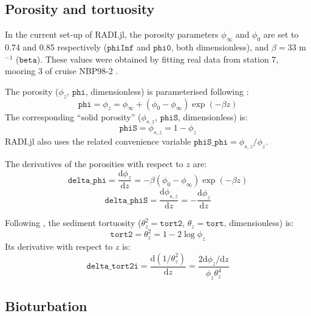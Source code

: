 \documentclass[a4paper]{article}
\newcommand{\D}[1]{\mathrm{d}#1}
\newcommand{\code}[1]{\texttt{#1}}
\begin{document}
\subsection{Porosity and tortuosity}

In the current set-up of RADI.jl, the porosity parameters $\phi_\infty$ and $\phi_0$ are set to 0.74 and 0.85 respectively ($\code{phiInf}$ and $\code{phi0}$, both dimensionless), and $\beta = 33$ m$^{-1}$ ($\code{beta}$).  These values were obtained by fitting real data from station 7, mooring 3 of cruise NBP98-2 \citep{sayles_benthic_2001}.

The porosity ($\phi_z$, $\code{phi}$, dimensionless) is parameterised following \citet{boudreau_method--lines_1996}:
\begin{equation}\label{phi}
\code{phi} = \phi_z = \phi_\infty + (\phi_0 - \phi_\infty) \exp(-\beta z)
\end{equation}
The corresponding ``solid porosity'' ($\phi_{s,z}$, $\code{phiS}$, dimensionless) is:
\begin{equation}\label{phiS}
\code{phiS} = \phi_{s,z} = 1 - \phi_z
\end{equation}
RADI.jl also uses the related convenience variable $\code{phiS\_phi} = \phi_{s,z}/\phi_z$.

The derivatives of the porosities with respect to $z$ are:
\begin{equation}
\code{delta\_phi} = \frac{\D{\phi_z}}{\D{z}} = -\beta (\phi_0 - \phi_\infty) \exp (-\beta z)
\end{equation}
\begin{equation}
\code{delta\_phiS} = \frac{\D{\phi_{s,z}}}{\D{z}} = -\frac{\D{\phi_z}}{\D{z}}
\end{equation}

Following \citet{boudreau_diffusive_1996}, the sediment tortuosity ($\theta_z^2 = \code{tort2}$, $\theta_z = \code{tort}$, dimensionless) is:
\begin{equation}\label{tort}
\code{tort2} = \theta_z^2 = 1 - 2 \log \phi_z
\end{equation}
Its derivative with respect to $z$ is:
\begin{equation}
\code{delta\_tort2i} = \frac{\D{(1 / \theta_z^2)}}{\D{z}} = \frac{2 \D{\phi_z}/\D{z}}{\phi_z \theta_z^4}
\end{equation}


\subsection{Bioturbation}
\end{document}
